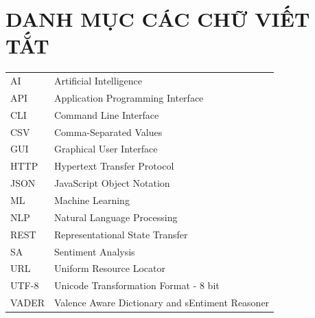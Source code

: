 
\section*{DANH MỤC CÁC CHỮ VIẾT TẮT}
 {}

\begin{tabular}{ l l }
\hspace{1cm} AI & \hspace{3cm} Artificial Intelligence \\
\hspace{1cm} API & \hspace{3cm} Application Programming Interface \\
\hspace{1cm} CLI & \hspace{3cm} Command Line Interface \\
\hspace{1cm} CSV & \hspace{3cm} Comma-Separated Values \\
\hspace{1cm} GUI & \hspace{3cm} Graphical User Interface \\
\hspace{1cm} HTTP & \hspace{3cm} Hypertext Transfer Protocol \\
\hspace{1cm} JSON & \hspace{3cm} JavaScript Object Notation \\
\hspace{1cm} ML & \hspace{3cm} Machine Learning \\
\hspace{1cm} NLP & \hspace{3cm} Natural Language Processing \\
\hspace{1cm} REST & \hspace{3cm} Representational State Transfer \\
\hspace{1cm} SA & \hspace{3cm} Sentiment Analysis \\
\hspace{1cm} URL & \hspace{3cm} Uniform Resource Locator \\
\hspace{1cm} UTF-8 & \hspace{3cm} Unicode Transformation Format - 8 bit \\
\hspace{1cm} VADER & \hspace{3cm} Valence Aware Dictionary and sEntiment Reasoner \\
         
\end{tabular}  

\newpage

